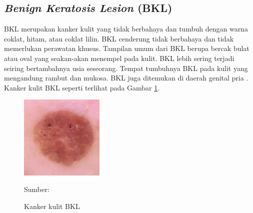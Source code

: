     \subsection{\textit{Benign Keratosis Lesion} (BKL)}
    BKL merupakan kanker kulit yang tidak berbahaya dan tumbuh dengan warna coklat, hitam, atau coklat lilin. BKL cenderung tidak berbahaya dan tidak memerlukan perawatan khusus. Tampilan umum dari BKL berupa bercak bulat atau oval yang seakan-akan menempel pada kulit. BKL lebih sering terjadi seiring bertambahnya usia seseorang. Tempat tumbuhnya BKL pada kulit yang mengandung rambut dan mukosa. BKL juga ditemukan di daerah genital pria \citep{Hall2019}. Kanker kulit BKL seperti terlihat pada Gambar \ref{fig:bkl}.
    \begin{figure}[H] 
        \begin{center} 
            \includegraphics[width=4cm]{img/bab2/bkl.jpg}
            \caption{Kanker kulit BKL} 
            \label{fig:bkl}
            Sumber: \citep{Codella2018,Combalia2019,Tschandl2018}
        \end{center} 
    \end{figure}

